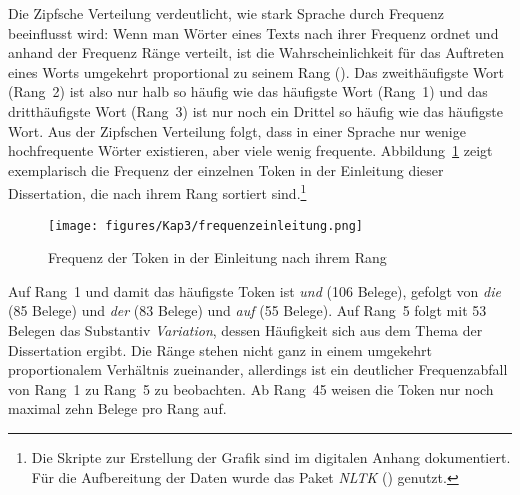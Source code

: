 Die Zipfsche Verteilung verdeutlicht, wie stark Sprache durch Frequenz beeinflusst wird: Wenn man Wörter eines Texts nach ihrer Frequenz ordnet und anhand der Frequenz Ränge verteilt, ist die Wahrscheinlichkeit für das Auftreten eines Worts umgekehrt proportional zu seinem Rang (\cites[22--27]{Zipf.1972}[13]{Ellis.2012}). Das zweithäufigste Wort (Rang~2) ist also nur halb so häufig wie das häufigste Wort (Rang~1) und das dritthäufigste Wort (Rang~3) ist nur noch ein Drittel so häufig wie das häufigste Wort. Aus der Zipfschen Verteilung folgt, dass in einer Sprache nur wenige hochfrequente Wörter existieren, aber viele wenig frequente. Abbildung~\ref{figurzipf} zeigt exemplarisch die Frequenz der einzelnen Token in der Einleitung dieser Dissertation, die nach ihrem Rang sortiert sind.\footnote{Die Skripte zur Erstellung der Grafik sind im digitalen Anhang dokumentiert. Für die Aufbereitung der Daten wurde das Paket \textit{NLTK} (\cite{NLTK.2020}) genutzt.} 

\begin{figure}
\texttt{[image: figures/Kap3/frequenzeinleitung.png]}
\caption{Frequenz der Token in der Einleitung nach ihrem Rang\label{figurzipf}}
\end{figure}

Auf Rang~1 und damit das häufigste Token ist \textit{und} (106 Belege), gefolgt von \textit{die} (85 Belege) und \textit{der} (83 Belege) und \textit{auf} (55 Belege). Auf Rang~5 folgt mit 53 Belegen das Substantiv \textit{Variation}, dessen Häufigkeit sich aus dem Thema der Dissertation ergibt. Die Ränge stehen nicht ganz in einem umgekehrt proportionalem Verhältnis zueinander, allerdings ist ein deutlicher Frequenzabfall von Rang~1 zu Rang~5 zu beobachten. Ab Rang~45 weisen die Token nur noch maximal zehn Belege pro Rang auf.

